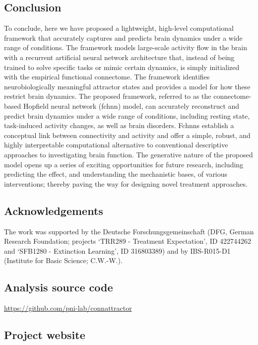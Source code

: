 \documentclass{article}
\begin{document}
\subsection{Conclusion}

To conclude, here we have proposed a lightweight, high-level computational framework that accurately captures and predicts brain dynamics under a wide range of conditions. The framework models large-scale activity flow in the brain with a recurrent artificial neural network architecture that, instead of being trained to solve specific tasks or mimic certain dynamics, is simply initialized with the empirical functional connectome. The framework identifies neurobiologically meaningful attractor states and provides a model for how these restrict brain dynamics. The proposed framework, referred to as the connectome-based Hopfield neural network (\acrshort{fchnn}) model, can accurately reconstruct and predict brain dynamics under a wide range of conditions, including resting state, task-induced activity changes, as well as brain disorders. Fc\acrshort{hnn}s establish a conceptual link between connectivity and activity and offer a simple, robust, and highly interpretable computational alternative to conventional descriptive approaches to investigating brain function. The generative nature of the proposed model opens up a series of exciting opportunities for future research, including predicting the effect, and understanding the mechanistic bases, of various interventions; thereby paving the way for designing novel treatment approaches.

\subsection{Acknowledgements}

The work was supported by the Deutsche Forschungsgemeinschaft (DFG, German Research Foundation; projects `TRR289 - Treatment Expectation', ID 422744262 and `SFB1280 - Extinction Learning', ID 316803389) and by IBS-R015-D1 (Institute for Basic Science; C.W.-W.).

\subsection{Analysis source code}

\href{https://github.com/pni-lab/connattractor}{https://github.com/pni-lab/connattractor}

\subsection{Project website}
\end{document}
